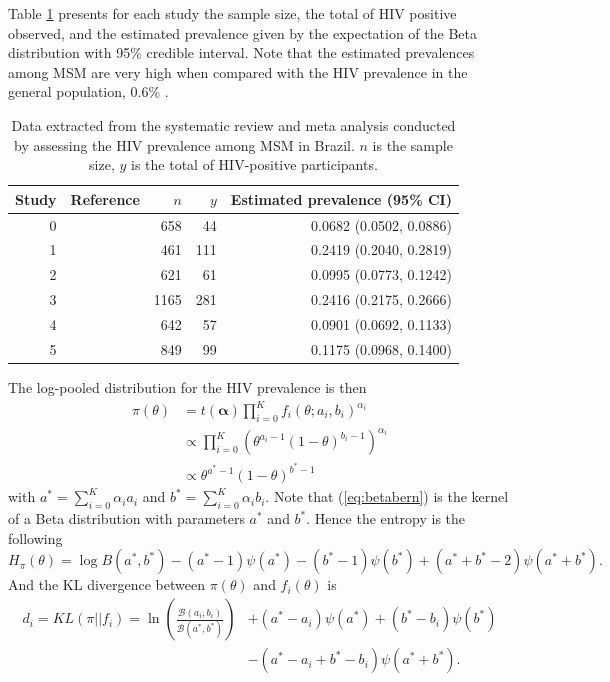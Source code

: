 \documentclass[a4paper, notitlepage, 10pt]{article}
\begin{document}
Table \ref{tbl:hivmsm} presents for each study the sample size, the total of HIV positive observed, and the estimated prevalence given by the expectation of the Beta distribution with 95\% credible interval. 
Note that the estimated prevalences among MSM are very high when compared with the HIV prevalence in the general population, 0.6\% \citep{malta2010hiv}.
\begin{table}[ht]
\caption{Data extracted from the systematic review and meta analysis conducted by \citet{malta2010hiv} assessing the HIV prevalence among MSM in Brazil. $n$ is the sample size, $y$ is the total of HIV-positive participants. }
\label{tbl:hivmsm}
\centering
\begin{tabular}{rlrrr}
  \hline
Study & Reference & $n$ & $y$ & Estimated prevalence (95\% CI)\\ 
  \hline
0 & \cite{tun2008sexual}            &  658 &  44 & 0.0682  (0.0502, 0.0886) \\ 
1 & \cite{barcellos2003prevalence}  &  461 & 111 & 0.2419  (0.2040, 0.2819) \\ 
2 & \cite{carneiro2003determinants} &  621 &  61 & 0.0995  (0.0773, 0.1242) \\ 
3 & \cite{sutmoller2002human}       & 1165 & 281 & 0.2416  (0.2175, 0.2666) \\ 
4 & \cite{BMH2000}                  &  642 &  57 & 0.0901  (0.0692, 0.1133) \\ 
5 & \cite{harrison1999incident}     &  849 &  99 & 0.1175  (0.0968, 0.1400) \\ 
   \hline
\end{tabular}
\end{table}


The log-pooled distribution for the HIV prevalence is then
\begin{align}
\pi(\theta) & = t(\boldsymbol\alpha)\prod_{i=0}^{K}f_i(\theta;a_i,b_i)^{\alpha_i}\\
            & \propto \prod_{i=0}^{K} \left(\theta^{a_i-1}(1-\theta)^{b_i-1} \right)^{\alpha_i}\\
\label{eq:betabern}
&\propto \theta^{a^*-1}(1-\theta)^{b^*-1}
\end{align}
with $a^* =\sum_{i=0}^{K}\alpha_ia_i$ and $b^* = \sum_{i=0}^{K}\alpha_ib_i$.
Note that (\ref{eq:betabern}) is the kernel of a Beta distribution with parameters $a^*$ and $b^*$. Hence the entropy is the following
\begin{equation}
 \label{eq:entropybeta}
 H_{\pi}(\theta) = \log B(a^*,b^*) - (a^*-1)\psi(a^*) - (b^*-1)\psi(b^*) + (a^*+b^* -2)\psi(a^*+b^*).
\end{equation}
And the KL divergence between $\pi(\theta)$ and $f_i(\theta)$  is
\begin{equation}
\begin{split}
 \label{eq:KLbeta}
 d_i = KL(\pi || f_i) = \ln\left(\frac{\mathcal{B}(a_i, b_i)}{\mathcal{B}(a^*, 
b^*)}\right) & + (a^* - a_i) \psi(a^*)+ (b^* - b_i)\psi(b^*) \\
 &- (a^*-a_i + b^* - b_i)\psi(a^*+b^*).
\end{split}
 \end{equation}
\end{document}
